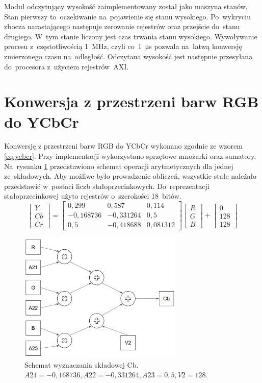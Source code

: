 Moduł odczytujący wysokość zaimplementowany został jako maszyna stanów. 
Stan pierwszy to~oczekiwanie na~pojawienie się stanu wysokiego. 
Po~wykryciu zbocza narastającego następuje zerowanie rejestrów oraz przejście do~stanu drugiego. 
W~tym stanie liczony jest czas trwania stanu wysokiego. 
Wywoływanie procesu z~częstotliwością 1~MHz, czyli co~1~\si{\micro\second} pozwala na~łatwą konwersję zmierzonego czasu na~odległość. 
Odczytana wysokość jest następnie przesyłana do~procesora z~użyciem rejestrów~AXI.


\section{Konwersja z przestrzeni barw RGB do YCbCr}
\label{subsec:konwersja}
Konwersję z przestrzeni barw RGB do YCbCr wykonano zgodnie ze wzorem \ref{eq:ycbcr}. 
Przy implementacji wykorzystano sprzętowe mnożarki oraz sumatory. 
Na~rysunku \ref{fig:drzewo_ycbcr} przedstawiono schemat operacji arytmetycznych dla jednej ze~składowych. 
Aby możliwe było prowadzenie obliczeń, wszystkie stałe należało przedstawić w~postaci liczb stałoprzecinkowych. 
Do~reprezentacji stałoprzecinkowej użyto rejestrów o~szerokości 18~bitów.
\begin{equation}
\label{eq:ycbcr}
\begin{bmatrix} Y \\ 
Cb\\
Cr
\end{bmatrix}=
\begin{bmatrix} 0,299 & 0,587 & 0,114\\ 
-0,168736 & -0,331264 & 0,5\\
0,5 & -0,418688 & 0,081312
\end{bmatrix}
\begin{bmatrix} R\\
G\\
B
\end{bmatrix}+
\begin{bmatrix} 0\\
128\\
128
\end{bmatrix}
\end{equation}


\begin{figure}[h]
	\centering
	\includegraphics[width=0.7\textwidth]{drzewo_ycbcr.jpg}
	\caption{Schemat wyznaczania składowej Cb. $A21=-0,168736, A22=-0,331264, A23=0,5, V2=128$.}
	\label{fig:drzewo_ycbcr}
\end{figure} 

